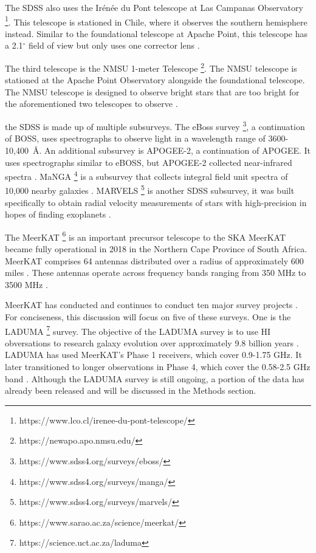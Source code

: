 \documentclass[preprint,linenumbers, longauthor]{aastex631}
\begin{document}
The SDSS also uses the Irénée du Pont telescope at Las Campanas Observatory \footnote{https://www.lco.cl/irenee-du-pont-telescope/}. This telescope is stationed in Chile, where it observes the southern hemisphere instead. 
Similar to the foundational telescope at Apache Point, this telescope has a 2.1$^\circ$ field of view but only uses one corrector lens \cite{bowenOpticalDesign40in1973}.

The third telescope is the NMSU 1-meter Telescope \footnote{https://newapo.apo.nmsu.edu/}. The NMSU telescope is stationed at the Apache Point Observatory alongside the foundational telescope. 
The NMSU telescope is designed to observe bright stars that are too bright for the aforementioned two telescopes to observe \citep{majewskiApachePointObservatory2017}. 

the SDSS is made up of multiple subsurveys. The eBoss survey \footnote{https://www.sdss4.org/surveys/eboss/}, a continuation of BOSS, uses spectrographs to observe light in a wavelength range of 3600-10,400~\AA \space \citep{dawsonSDSSIVEXTENDEDBARYON2016}.
An additional subsurvey is APOGEE-2, a continuation of APOGEE. It uses spectrographs similar to eBOSS, but APOGEE-2 collected near-infrared spectra \citep{majewskiApachePointObservatory2017}. 
MaNGA \footnote{https://www.sdss4.org/surveys/manga/} is a subsurvey that collects integral field unit spectra of 10,000 nearby galaxies \citep{bundyOVERVIEWSDSSIVMaNGA2014}.
MARVELS \footnote{https://www.sdss4.org/surveys/marvels/} is another SDSS subsurvey, it was built specifically to obtain radial velocity measurements of stars with high-precision in hopes of finding exoplanets \citep{bundyOVERVIEWSDSSIVMaNGA2014a}.


The MeerKAT \footnote{https://www.sarao.ac.za/science/meerkat/} is an important precursor telescope to the SKA \citep{jonasMeerKATRadioTelescope2018}
MeerKAT became fully operational in 2018 in the Northern Cape Province of South Africa.
MeerKAT comprises 64 antennas distributed over a radius of approximately 600 miles \cite{goedhartMeerKATSpecifications2025}. These antennas operate across frequency bands ranging from 350 MHz to 3500 MHz \citep{goedhartMeerKATSpecifications2025}.

MeerKAT has conducted and continues to conduct ten major survey projects \citep{jonasMeerKATRadioTelescope2018}. For conciseness, this discussion will focus on five of these surveys.
One is the LADUMA \footnote{https://science.uct.ac.za/laduma} survey.
The objective of the LADUMA survey is to use HI obversations to research galaxy evolution over approximately 9.8 billion years \citep{blythLADUMALookingDistant2018}. 
LADUMA has used MeerKAT's Phase 1 receivers, which cover 0.9-1.75 GHz. It later transitioned to longer observations in Phase 4, which cover the 0.58-2.5 GHz band \citep{blythLADUMALookingDistant2018}.
Although the LADUMA survey is still ongoing, a portion of the data has already been released and will be discussed in the Methods section.
\end{document}
